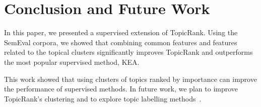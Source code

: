 \section{Conclusion and Future Work}
\label{sec:conclusion_and_future_work}
  In this paper, we presented a supervised extension of TopicRank. Using the
  SemEval corpora, we showed that combining common features and features related
  to the topical clusters significantly improves TopicRank and outperforms the
  most popular supervised method, KEA.

  This work showed that using clusters of topics ranked by importance can
  improve the performance of supervised methods. In future work, we plan to
  improve TopicRank's clustering and to explore topic labelling
  methods~\cite{mei2007topiclabeling,lau2011topiclabeling}.

